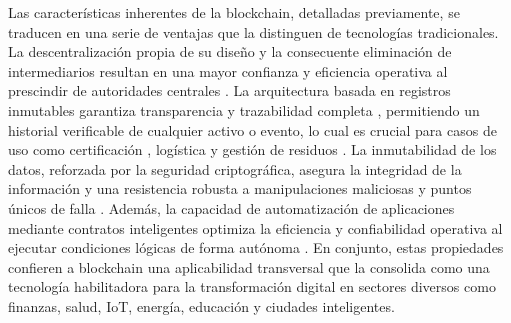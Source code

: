 Las características inherentes de la blockchain, detalladas previamente, se traducen en una serie de ventajas que la distinguen de tecnologías tradicionales. La descentralización propia de su diseño y la consecuente eliminación de intermediarios resultan en una mayor confianza \cite{rejeb2023role} y eficiencia operativa al prescindir de autoridades centrales \cite{sharabati2024blockchain}. La arquitectura basada en registros inmutables garantiza transparencia y trazabilidad completa \cite{sharabati2024blockchain}, permitiendo un historial verificable de cualquier activo o evento, lo cual es crucial para casos de uso como certificación \cite{bartolomeo2020introduccion}, logística \cite{bartolomeo2020introduccion, rejeb2023role} y gestión de residuos \cite{bulkowska2023implementation}. La inmutabilidad de los datos, reforzada por la seguridad criptográfica, asegura la integridad de la información \cite{sunny2022systematic} y una resistencia robusta a manipulaciones maliciosas y puntos únicos de falla \cite{bartolomeo2020introduccion}. Además, la capacidad de automatización de aplicaciones mediante contratos inteligentes optimiza la eficiencia y confiabilidad operativa al ejecutar condiciones lógicas de forma autónoma \cite{bartolomeo2020introduccion}. En conjunto, estas propiedades confieren a blockchain una aplicabilidad transversal que la consolida como una tecnología habilitadora para la transformación digital en sectores diversos como finanzas, salud, IoT, energía, educación y ciudades inteligentes.

